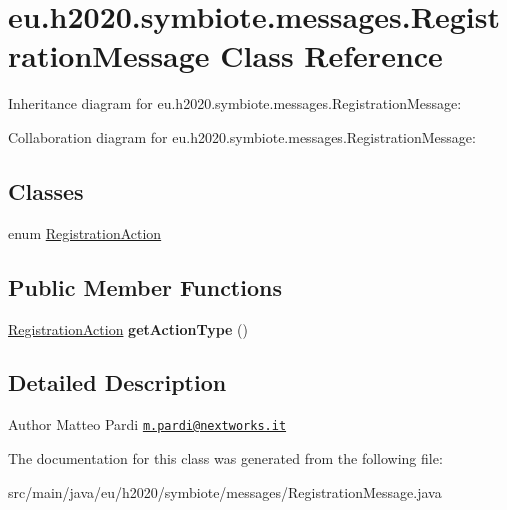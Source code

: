 \hypertarget{classeu_1_1h2020_1_1symbiote_1_1messages_1_1RegistrationMessage}{}\section{eu.\+h2020.\+symbiote.\+messages.\+Registration\+Message Class Reference}
\label{classeu_1_1h2020_1_1symbiote_1_1messages_1_1RegistrationMessage}


Inheritance diagram for eu.\+h2020.\+symbiote.\+messages.\+Registration\+Message\+:


Collaboration diagram for eu.\+h2020.\+symbiote.\+messages.\+Registration\+Message\+:
\subsection*{Classes}
\begin{DoxyCompactItemize}
\item 
enum \hyperlink{enumeu_1_1h2020_1_1symbiote_1_1messages_1_1RegistrationMessage_1_1RegistrationAction}{Registration\+Action}
\end{DoxyCompactItemize}
\subsection*{Public Member Functions}
\begin{DoxyCompactItemize}
\item 
\mbox{\label{classeu_1_1h2020_1_1symbiote_1_1messages_1_1RegistrationMessage_a659cd5322aa8f47215e47c8ce0909ae8}} 
\hyperlink{enumeu_1_1h2020_1_1symbiote_1_1messages_1_1RegistrationMessage_1_1RegistrationAction}{Registration\+Action} {\bfseries get\+Action\+Type} ()
\end{DoxyCompactItemize}


\subsection{Detailed Description}
\begin{DoxyAuthor}{Author}
Matteo Pardi \href{mailto:m.pardi@nextworks.it}{\tt m.\+pardi@nextworks.\+it} 
\end{DoxyAuthor}


The documentation for this class was generated from the following file\+:\begin{DoxyCompactItemize}
\item 
src/main/java/eu/h2020/symbiote/messages/Registration\+Message.\+java\end{DoxyCompactItemize}
